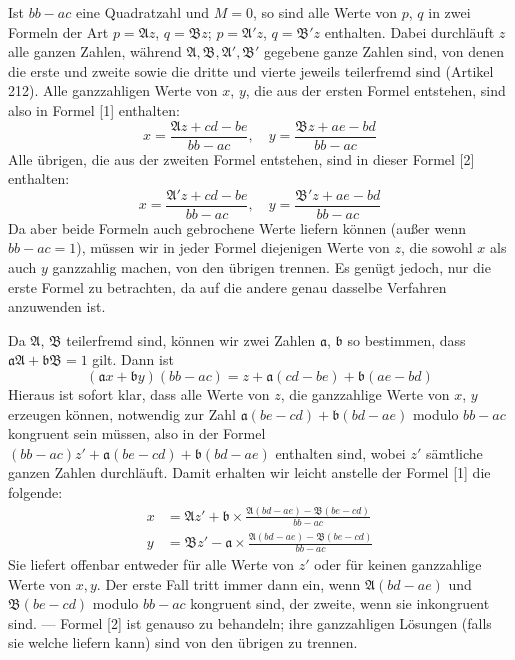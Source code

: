 Ist $bb-ac$ eine Quadratzahl und $M=0$, so sind alle Werte von $p$, $q$ in zwei Formeln der Art $p=\mathfrak{A}z$, $q=\mathfrak{B}z$; $p=\mathfrak{A}'z$, $q=\mathfrak{B}'z$ enthalten. Dabei durchläuft $z$ alle ganzen Zahlen, während $\mathfrak{A},\mathfrak{B},\mathfrak{A}',\mathfrak{B}'$ gegebene ganze Zahlen sind, von denen die erste und zweite sowie die dritte und vierte jeweils teilerfremd sind (Artikel 212). Alle ganzzahligen Werte von $x$, $y$, die aus der ersten Formel entstehen, sind also in Formel [1] enthalten:
\[
x=\frac{\mathfrak{A}z+cd-be}{bb-ac},\quad
y=\frac{\mathfrak{B}z+ae-bd}{bb-ac}
\]
Alle übrigen, die aus der zweiten Formel entstehen, sind in dieser Formel [2] enthalten:
\[
x=\frac{\mathfrak{A}'z+cd-be}{bb-ac},\quad
y=\frac{\mathfrak{B}'z+ae-bd}{bb-ac}
\]
Da aber beide Formeln auch gebrochene Werte liefern können (außer wenn $bb-ac=1$), müssen wir in jeder Formel diejenigen Werte von $z$, die sowohl $x$ als auch $y$ ganzzahlig machen, von den übrigen trennen. Es genügt jedoch, nur die erste Formel zu betrachten, da auf die andere genau dasselbe Verfahren anzuwenden ist.

Da $\mathfrak{A}$, $\mathfrak{B}$ teilerfremd sind, können wir zwei Zahlen $\mathfrak{a}$, $\mathfrak{b}$ so bestimmen, dass $\mathfrak{a}\mathfrak{A}+\mathfrak{b}\mathfrak{B}=1$ gilt. Dann ist
\[
(\mathfrak{a}x+\mathfrak{b}y)(bb-ac)=z+\mathfrak{a}(cd-be)+\mathfrak{b}(ae-bd)
\]
Hieraus ist sofort klar, dass alle Werte von $z$, die ganzzahlige Werte von $x$, $y$ erzeugen können, notwendig zur Zahl $\mathfrak{a}(be-cd)+\mathfrak{b}(bd-ae)$ modulo $bb-ac$ kongruent sein müssen, also in der Formel $(bb-ac)z'+\mathfrak{a}(be-cd)+\mathfrak{b}(bd-ae)$ enthalten sind, wobei $z'$ sämtliche ganzen Zahlen durchläuft. Damit erhalten wir leicht anstelle der Formel [1] die folgende:
\[
\begin{aligned}
x&=\mathfrak{A}z'+\mathfrak{b}\times\frac{\mathfrak{A}(bd-ae)-\mathfrak{B}(be-cd)}{bb-ac}\\
y&=\mathfrak{B}z'-\mathfrak{a}\times\frac{\mathfrak{A}(bd-ae)-\mathfrak{B}(be-cd)}{bb-ac}
\end{aligned}
\]
Sie liefert offenbar entweder für alle Werte von $z'$ oder für keinen ganzzahlige Werte von $x,y$. Der erste Fall tritt immer dann ein, wenn $\mathfrak{A}(bd-ae)$ und $\mathfrak{B}(be-cd)$ modulo $bb-ac$ kongruent sind, der zweite, wenn sie inkongruent sind. --- Formel [2] ist genauso zu behandeln; ihre ganzzahligen Lösungen (falls sie welche liefern kann) sind von den übrigen zu trennen.

